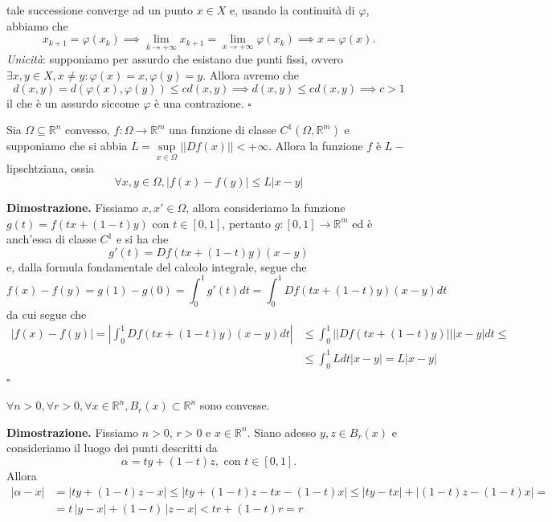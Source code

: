 	tale successione converge ad un punto $x \in X$ e, usando la continuità di $\varphi$, abbiamo che
	\[
	x_{k+1} = \varphi(x_k) \implies \lim_{k \to +\infty} x_{k+1} = \lim_{x \to +\infty} \varphi(x_k) \implies x = \varphi(x).
	\]
	\emph{Unicità}: supponiamo per assurdo che esistano due punti fissi, ovvero $\exists x, y \in X, x \neq y : \varphi(x) = x, \varphi(y) = y$. Allora avremo che
	\[
	d(x, y) = d(\varphi(x), \varphi(y)) \leq c d(x, y) \implies d(x, y) \leq c d(x, y) \implies c > 1
	\]
	il che è un assurdo siccome $\varphi$ è una contrazione.
\hfill $\square$
%
\vspace{0.5cm}
\begin{theorem}[\textcolor{blue}{criterio di Lipschtiz}]
	Sia $\Omega \subseteq \mathbb{R}^n$ convesso, $f: \Omega \to \mathbb{R}^m$ una funzione di classe $C^1(\Omega, \mathbb{R}^m)$ e supponiamo che si abbia $L = \sup\limits_{x \in \Omega} ||Df(x)|| < +\infty$. Allora la funzione
	$f$ è $L-$lipschtziana, ossia
	\[
	\forall x, y \in \Omega, |f(x) - f(y)| \leq L|x-y|
	\]
\end{theorem}
%
\noindent \textbf{Dimostrazione. }
	Fissiamo $x, x' \in \Omega$, allora consideriamo la funzione $g(t) = f(tx + (1-t)y)$ con $t \in [0, 1]$, pertanto $g: [0, 1] \to \mathbb{R}^m$ ed è anch'essa di classe $C^1$ e si ha che
	\[
	g'(t) = Df(tx + (1-t)y)(x - y)
	\]
	e, dalla formula fondamentale del calcolo integrale, segue che 
	\[
	f(x) - f(y) = g(1) - g(0) = \int_0^1 g'(t)dt = \int_0^1 Df(tx + (1-t)y)(x-y)dt
	\]
	da cui segue che
	\[\begin{aligned}
	|f(x) - f(y)| = |\int_0^1 Df(tx + (1-t)y)(x-y)dt| &\leq \int_0^1 || Df(tx + (1-t)y) || |x-y|dt \leq \\
	&\leq \int_0^1 Ldt |x-y| = L|x-y|
	\end{aligned}\]
\hfill $\square$
%
\vspace{0.5cm}
\begin{lemma}
    $\forall n > 0, \forall r > 0, \forall x \in \mathbb{R}^n, B_r(x) \subset \mathbb{R}^n$ sono convesse.
\end{lemma}
%
\noindent \textbf{Dimostrazione. }
    Fissiamo $n > 0$, $r > 0$ e $x \in \mathbb{R}^n$. Siano adesso $y, z \in B_r(x)$ e consideriamo il luogo dei punti descritti da
    \[
    \alpha = ty + (1-t)z, \text{ con } t \in [0, 1].
    \]
    Allora
    \[\begin{aligned}
    | \alpha - x | &= |ty + (1-t)z - x| \leq |ty + (1-t)z - tx - (1 - t)x| \leq |ty - tx| + |(1-t)z - (1-t)x| = \\
    &=t \, |y - x| + (1-t) \, |z - x| < tr + (1-t)r = r 
    \end{aligned}\]
